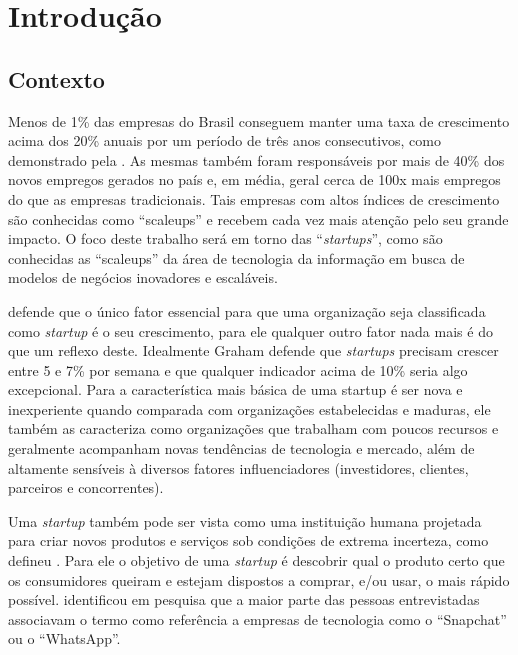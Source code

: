 \chapter{Introdução}
\label{cap-introducao}

\section{Contexto}
\label{section:contexto}

Menos de 1\% das empresas do Brasil conseguem manter uma taxa de crescimento acima dos 20\% anuais por um período de três anos consecutivos, como demonstrado pela . As mesmas também foram responsáveis por mais de 40\% dos novos empregos gerados no país e, em média, geral cerca de 100x mais empregos do que as empresas tradicionais. Tais empresas com altos índices de crescimento são conhecidas como ``scaleups'' e recebem cada vez mais atenção pelo seu grande impacto. O foco deste trabalho será em torno das ``\textit{startups}'', como são conhecidas as ``scaleups'' da área de tecnologia da informação em busca de modelos de negócios inovadores e escaláveis.

 defende que o único fator essencial para que uma organização seja classificada como \textit{startup} é o seu crescimento, para ele qualquer outro fator nada mais é do que um reflexo deste. Idealmente Graham defende que \textit{startups} precisam crescer entre 5 e 7\% por semana e que qualquer indicador acima de 10\% seria algo excepcional. Para  a característica mais básica de uma startup é ser nova e inexperiente quando comparada com organizações estabelecidas e maduras, ele também as caracteriza como organizações que trabalham com poucos recursos e geralmente acompanham novas tendências de tecnologia e mercado, além de altamente sensíveis à diversos fatores influenciadores (investidores, clientes, parceiros e concorrentes).

Uma \textit{startup} também pode ser vista como uma instituição humana projetada para criar novos produtos e serviços sob condições de extrema incerteza, como defineu . Para ele o objetivo de uma \textit{startup} é descobrir qual o produto certo que os consumidores queiram e estejam dispostos a comprar, e/ou usar, o mais rápido possível.  identificou em pesquisa que a maior parte das pessoas entrevistadas associavam o termo como referência a empresas de tecnologia como o ``Snapchat'' ou o ``WhatsApp''.

